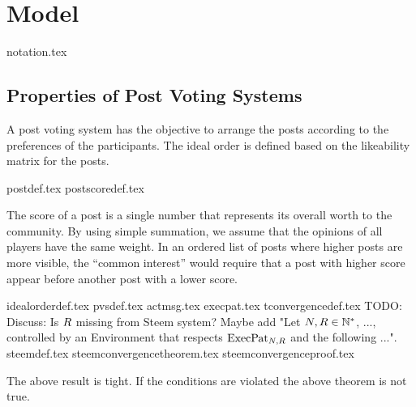 \section{Model}
  {notation.tex}
  \subsection{Properties of Post Voting Systems}
    A post voting system has the objective to arrange the posts according to the
    preferences of the participants. The ideal order is defined based on the
    likeability matrix for the posts.

    {postdef.tex}
    {postscoredef.tex}

    The score of a post is a single number that represents its overall worth to
    the community. By using simple summation, we assume that the opinions of all
    players have the same weight. In an ordered list of posts where higher posts
    are more visible, the ``common interest'' would require that a post with
    higher score appear before another post with a lower score.

    {idealorderdef.tex}
    {pvsdef.tex}
    {actmsg.tex}
    {execpat.tex}
    {tconvergencedef.tex}
    TODO: Discuss: Is $R$ missing from Steem system? Maybe add "Let
    $N, R \in \mathbb{N}^*$, ..., controlled by an Environment
    that respects $\mathrm{ExecPat}_{N, R}$ and the following ...".
    {steemdef.tex}
    {steemconvergencetheorem.tex}
    {steemconvergenceproof.tex}

    The above result is tight.
    If the conditions are violated the above theorem is not true.
